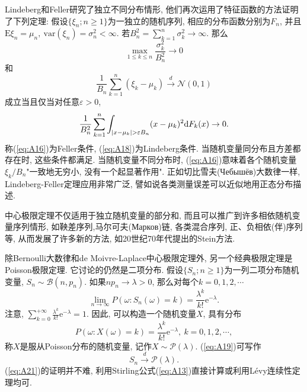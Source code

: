 Lindeberg和Feller研究了独立不同分布情形, 他们再次运用了特征函数的方法证明了下列定理: 假设$\{\xi_n;n\geqslant 1\}$为一独立的随机序列, 相应的分布函数分别为$F_n$, 并且$\mathrm{E}\xi_n = \mu_n,~\mathrm{var}(\xi_n) = \sigma^2_n<\infty$. 若$B_n^2 = \sum_{k=1}^{n}\sigma_k^2\to\infty$. 那么
\begin{equation}\label{eq:A16}
\max_{1\leqslant k\leqslant n} \frac{\sigma^2_k}{B_n^2}\to 0
\end{equation}
和\begin{equation}\label{eq:A17}
\frac{1}{B_n}\sum_{k=1}^n(\xi_k-\mu_k)\stackrel{d}{\rightarrow}\mathcal{N}(0,1)
\end{equation}
成立当且仅当对任意$\varepsilon>0$,
\begin{equation}\label{eq:A18}
\frac{1}{B_n^2}\sum_{k=1}^n\int_{\lvert x-\mu_k\rvert>\varepsilon B_n}(x-\mu_k)^2\mathrm{d}F_k(x)\to 0.
\end{equation}
称(\ref{eq:A16})为Feller条件, (\ref{eq:A18})为Lindeberg条件.  当随机变量同分布且方差都存在时, 这些条件都满足. 当随机变量不同分布时, (\ref{eq:A16})意味着各个随机变量$\xi_k/B_n$"一致地无穷小, 没有一个起显著作用". 正如切比雪夫(Чебышёв)大数律一样, Lindeberg-Feller定理应用非常广泛, 譬如说各类测量误差可以近似地用正态分布描述.

中心极限定理不仅适用于独立随机变量的部分和, 而且可以推广到许多相依随机变量序列情形, 如鞅差序列,马尔可夫(Марков)链, 各类混合序列, 正、负相依(伴)序列等, 从而发展了许多新的方法, 如20世纪70年代提出的Stein方法.

除Bernoulli大数律和de Moivre-Laplace中心极限定理外, 另一个经典极限定理是Poisson极限定理. 它讨论的仍然是二项分布. 假设$\{S_n;n\geqslant 1\}$为一列二项分布随机变量, $S_n\sim\mathcal{B}(n,p_n)$. 如果$np_n\to \lambda>0$, 那么对每个$k=0,1,2,\cdots$
\begin{equation}\label{eq:A19}
\lim_{n\to\infty}P(\omega:S_n(\omega) = k) = \frac{\lambda^k}{k!}\mathrm{e}^{-\lambda}.
\end{equation}
注意, $\sum_{k=0}^{+\infty}\frac{\lambda^k}{k!}\mathrm{e}^{-\lambda} = 1$. 因此, 可以构造一个随机变量$X$, 具有分布\begin{equation}\label{eq:A20}
P(\omega:X(\omega) = k) = \frac{\lambda^k}{k!}\mathrm{e}^{-\lambda},~k=0,1,2,\cdots,
\end{equation}
称$X$是服从Poisson分布的随机变量, 记作$X\sim\mathcal{P}(\lambda)$. (\ref{eq:A19})可写作
\begin{equation}\label{eq:A21}
S_n\stackrel{d}{\rightarrow}\mathcal{P}(\lambda).
\end{equation}
(\ref{eq:A21})的证明并不难, 利用Stirling公式(\ref{eq:A13})直接计算或利用Lévy连续性定理均可.

